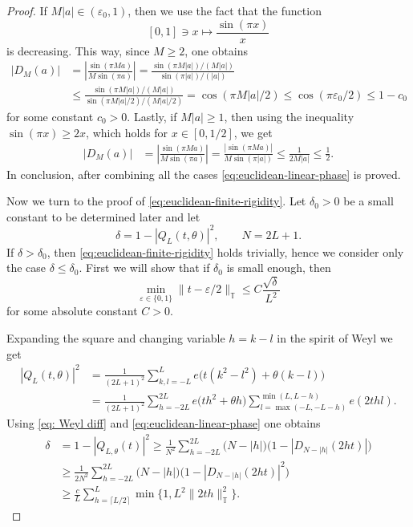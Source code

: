 \documentclass{article}
\newcommand{\T}{\mathbb T}
\theoremstyle{plain}
\numberwithin{equation}{section}
\begin{document}
\begin{proof}
If $M|a| \in (\varepsilon_0, 1)$, then we use the fact that the function 
\[
 [0,1] \ni x \mapsto \frac{\sin(\pi x)}{x}
\]
is decreasing. This way, since $M \ge 2$, one obtains
\begin{align*}
    \left|D_M(a)\right|&= \left| \frac{\sin(\pi Ma)}{M \sin(\pi a)}  \right|= \frac{\sin(\pi M|a|)/(M|a|)}{ \sin(\pi|a|)/(|a|)} 
    \\
    &\le \frac{\sin(\pi M|a|)/(M|a|)}{ \sin(\pi M |a|/2)/(M|a|/2)}  = \cos(\pi M|a|/2) \le \cos(\pi\varepsilon_0/2) \le 1-c_0
\end{align*}
for some constant $c_0>0$. Lastly, if $M|a| \ge 1$, then using the inequality $\sin (\pi x) \ge 2x$, which holds for $x \in [0, 1/2]$, we get
\begin{align*}
    \left|D_M(a)\right|&= \left| \frac{\sin(\pi Ma)}{M \sin(\pi a)}  \right|= \frac{|\sin(\pi Ma)|}{ M\sin(\pi|a|)} \le  \frac{1}{2M |a|} \le \frac{1}{2}.
\end{align*}
In conclusion, after combining all the cases \eqref{eq:euclidean-linear-phase} is proved.
\par
Now we turn to the proof of \eqref{eq:euclidean-finite-rigidity}.
Let $\delta_0>0$ be a small constant to be determined later and let
\begin{equation*}
    \delta= 1- \left|Q_{L}(t, \theta) \right|^2, \qquad N=2L+1.
\end{equation*}
If $\delta>\delta_0$, then \eqref{eq:euclidean-finite-rigidity} holds trivially, hence we consider only the case $\delta \le \delta_0$.
First we will show that if $\delta_0$ is small enough, then 
\begin{equation} \label{eq: bound on t}
    \min_{\varepsilon \in \{0,1\}}\|t-\varepsilon/2 \|_{\T} \le C \frac{\sqrt{\delta}}{L^2}
\end{equation}
for some absolute constant $C>0$.

Expanding the square and changing variable $h=k-l$ in the spirit of Weyl we get 
\begin{equation} 
\label{eq: Weyl diff}
\begin{split}
    |Q_{L}(t, \theta)|^2&= \frac{1}{(2L+1)^2} \sum_{k,l=-L}^L e\big(t(k^2-l^2)+\theta(k-l) \big) \\
    & =\frac{1}{(2L+1)^2} \sum_{h=-2L}^{2L} e\big( th^2+\theta h\big) \sum_{l=\max(-L,-L-h)}^{\min(L,L-h)}e(2t hl).
\end{split}
\end{equation}
Using \eqref{eq: Weyl diff} and \eqref{eq:euclidean-linear-phase} one obtains
\begin{align*}
    \delta&=1-|Q_{L,\theta}(t)|^2 \ge  \frac{1}{N^2} \sum_{h=-2L}^{2L} \Big(N-|h| \Big) \Big(1- \left|D_{N-|h|}(2 ht) \right|\Big) \\
    &\ge \frac{1}{2N^2} \sum_{h=-2L}^{2L} \Big(N-|h| \Big) \Big(1- \left|D_{N-|h|}(2 ht) \right|^2\Big) \\
    &\ge  \frac{c}{L} \sum_{h=\lceil L/2 \rceil}^L  \min\{1, L^2 \|2t h \|_{\T}^2 \}.
\end{align*}


\end{proof}
\end{document}
